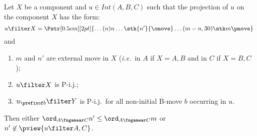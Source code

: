 \begin{lemma}
\label{lem:compos_auxiliary_lemma}
Let $X$ be a component and $u \in Int(A,B,C)$ such that
the projection of $u$ on the component $X$ has the form:
$$ u \filter X =
\Pstr[0.5cm][2pt]{ \ldots (n){n}  \ldots
 {\stk {n'}{\omove}}  \ldots  (m-n,30){\stk m {\pmove}}
}$$
and
\begin{enumerate}
  \item $m$ and $n'$ are external move in $X$ ({\it i.e.}~in $A$ if $X =A,B$ and in $C$ if $X=B,C$);
  \item $u\filter X$ is P-i.j.;
  \item $u_{\prefixof b}\filter Y$ is P-i.j.\ for all non-initial B-move $b$ occurring in $u$.
\end{enumerate}
Then either $\ord_{A\fngamear C} n' \leq \ord_{A\fngamear C} m$ or $n' \not \in \pview{u\filter A,C}$.
\end{lemma}
